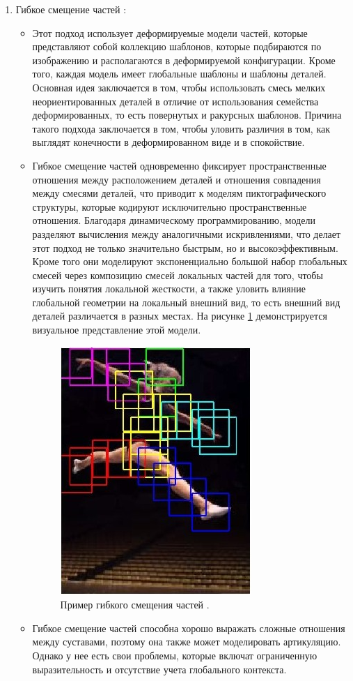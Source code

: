 \begin{enumerate}[label=\arabic*)]
 	\item Гибкое смещение частей \cite{FPE}:
 		
 		\begin{itemize}
 			\item Этот подход использует деформируемые модели частей, которые представляют собой коллекцию шаблонов, которые подбираются по изображению и располагаются в деформируемой конфигурации. 
 			Кроме того, каждая модель имеет глобальные шаблоны и шаблоны деталей. 
 			Основная идея заключается в том, чтобы использовать смесь мелких неориентированных деталей в отличие от использования семейства деформированных, то есть повернутых и ракурсных шаблонов.
 			Причина такого подхода заключается в том, чтобы уловить различия в том, как выглядят конечности в деформированном виде и в спокойствие.
 			
 			\item Гибкое смещение частей одновременно фиксирует пространственные отношения между расположением деталей и отношения совпадения между смесями деталей, что приводит к моделям пиктографического структуры, которые кодируют исключительно пространственные отношения. 
 			Благодаря динамическому программированию, модели разделяют вычисления между аналогичными искривлениями, что делает этот подход не только значительно быстрым, но и высокоэффективным.
 			Кроме того они моделируют экспоненциально большой набор глобальных смесей через композицию смесей локальных частей для того, чтобы изучить понятия локальной жесткости, а также уловить влияние глобальной геометрии на локальный внешний вид, то есть внешний вид деталей различается в разных местах. 
 			На рисунке \ref{img:fpe} демонстрируется визуальное представление этой модели.
 			
 			\begin{figure}[ht!]
 				\centering
 				\includegraphics[width=0.3\linewidth]{assets/fpe.jpeg}
 				\caption{Пример гибкого смещения частей \cite{FMPImage}.}
 				\label{img:fpe}
 			\end{figure}
 			\FloatBarrier
 			\item Гибкое смещение частей способна хорошо выражать сложные отношения между суставами, поэтому она также может моделировать артикуляцию.
 			Однако у нее есть свои проблемы, которые включат ограниченную выразительность и отсутствие учета глобального контекста.
 			

\end{itemize}
\end{enumerate}
